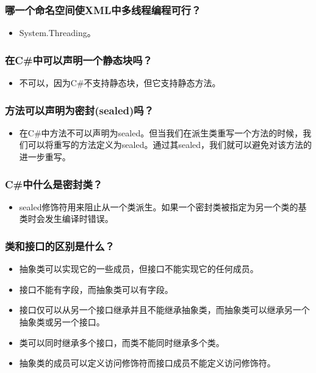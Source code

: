 \documentclass[9pt, b5paper]{article}
\begin{document}
\subsubsection{哪一个命名空间使XML中多线程编程可行？}
\label{sec-1-2-50}
\begin{itemize}
\item System.Threading。
\end{itemize}
\subsubsection{在C\#中可以声明一个静态块吗？}
\label{sec-1-2-51}
\begin{itemize}
\item 不可以，因为C\#不支持静态块，但它支持静态方法。
\end{itemize}
\subsubsection{方法可以声明为密封(sealed)吗？}
\label{sec-1-2-52}
\begin{itemize}
\item 在C\#中方法不可以声明为sealed。但当我们在派生类重写一个方法的时候，我们可以将重写的方法定义为sealed。通过其sealed，我们就可以避免对该方法的进一步重写。
\end{itemize}
\subsubsection{C\#中什么是密封类？}
\label{sec-1-2-53}
\begin{itemize}
\item sealed修饰符用来阻止从一个类派生。如果一个密封类被指定为另一个类的基类时会发生编译时错误。
\end{itemize}
\subsubsection{类和接口的区别是什么？}
\label{sec-1-2-54}
\begin{itemize}
\item 抽象类可以实现它的一些成员，但接口不能实现它的任何成员。
\item 接口不能有字段，而抽象类可以有字段。
\item 接口仅可以从另一个接口继承并且不能继承抽象类，而抽象类可以继承另一个抽象类或另一个接口。
\item 类可以同时继承多个接口，而类不能同时继承多个类。
\item 抽象类的成员可以定义访问修饰符而接口成员不能定义访问修饰符。
\end{itemize}
\end{document}
